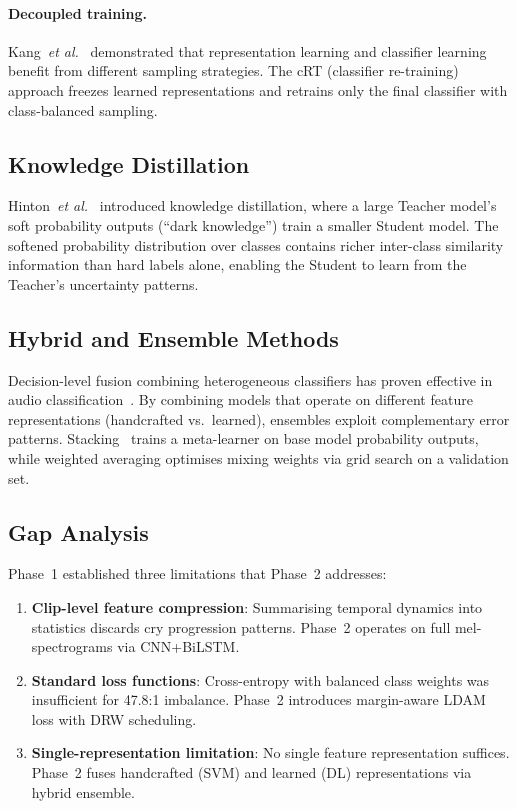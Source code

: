 \documentclass[11pt,a4paper]{article}
\begin{document}
\paragraph{Decoupled training.}
Kang~\textit{et al.}~\cite{kang2020decoupled} demonstrated that
representation learning and classifier learning benefit from different
sampling strategies. The cRT (classifier re-training) approach freezes
learned representations and retrains only the final classifier with
class-balanced sampling.

\subsection{Knowledge Distillation}

Hinton~\textit{et al.}~\cite{hinton2015distilling} introduced knowledge
distillation, where a large Teacher model's soft probability outputs
(``dark knowledge'') train a smaller Student model. The softened
probability distribution over classes contains richer inter-class
similarity information than hard labels alone, enabling the Student to
learn from the Teacher's uncertainty patterns.

\subsection{Hybrid and Ensemble Methods}

Decision-level fusion combining heterogeneous classifiers has proven
effective in audio classification~\cite{ji2021review}. By combining
models that operate on different feature representations (handcrafted
vs.\ learned), ensembles exploit complementary error patterns.
Stacking~\cite{wolpert1992stacked} trains a meta-learner on base model
probability outputs, while weighted averaging optimises mixing weights
via grid search on a validation set.

\subsection{Gap Analysis}

Phase~1 established three limitations that Phase~2 addresses:
\begin{enumerate}[nosep]
  \item \textbf{Clip-level feature compression}: Summarising temporal
        dynamics into statistics discards cry progression patterns.
        Phase~2 operates on full mel-spectrograms via CNN+BiLSTM.
  \item \textbf{Standard loss functions}: Cross-entropy with balanced
        class weights was insufficient for 47.8:1 imbalance. Phase~2
        introduces margin-aware LDAM loss with DRW scheduling.
  \item \textbf{Single-representation limitation}: No single feature
        representation suffices. Phase~2 fuses handcrafted (SVM) and
        learned (DL) representations via hybrid ensemble.
\end{enumerate}
\end{document}
